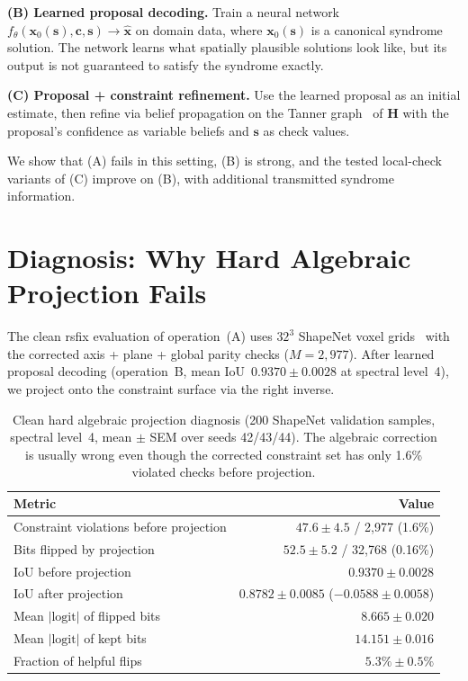 \documentclass[11pt,a4paper]{article}
\begin{document}
\textbf{(B) Learned proposal decoding.}
Train a neural network
$f_\theta(\mathbf{x}_0(\mathbf{s}),\mathbf{c},\mathbf{s}) \to
\hat{\mathbf{x}}$ on domain data, where $\mathbf{x}_0(\mathbf{s})$ is a
canonical syndrome solution. The network learns what spatially plausible
solutions look like, but its output is not guaranteed to satisfy the syndrome
exactly.

\textbf{(C) Proposal + constraint refinement.}
Use the learned proposal as an initial estimate, then refine via belief
propagation on the Tanner graph~\cite{tanner,kfl2001} of $\mathbf{H}$ with the
proposal's confidence as variable beliefs and $\mathbf{s}$ as check values.

We show that (A) fails in this setting, (B) is strong,
and the tested local-check variants of (C) improve on (B), with
additional transmitted syndrome information.

\section{Diagnosis: Why Hard Algebraic Projection Fails}
\label{sec:diagnosis}

The clean rsfix evaluation of operation~(A) uses $32^3$ ShapeNet voxel
grids~\cite{3dr2n2} with the corrected axis + plane + global parity checks
($M = 2{,}977$). After learned proposal decoding (operation~B, mean
IoU~$0.9370\pm0.0028$ at spectral level~4), we project onto the constraint
surface via the right inverse.

\begin{table}[htbp]
\centering
\caption{Clean hard algebraic projection diagnosis (200 ShapeNet validation
  samples, spectral level~4, mean $\pm$ SEM over seeds 42/43/44). The algebraic
  correction is usually wrong even though the corrected constraint set has
  only 1.6\% violated checks before projection.}
\label{tab:projection}
\begin{tabular}{lr}
\toprule
Metric & Value \\
\midrule
Constraint violations before projection & $47.6 \pm 4.5$ / 2{,}977 (1.6\%) \\
Bits flipped by projection & $52.5 \pm 5.2$ / 32{,}768 (0.16\%) \\
IoU before projection & $0.9370 \pm 0.0028$ \\
IoU after projection & $0.8782 \pm 0.0085$ (\textbf{$-0.0588 \pm 0.0058$}) \\
Mean $|\text{logit}|$ of flipped bits & $8.665 \pm 0.020$ \\
Mean $|\text{logit}|$ of kept bits & $14.151 \pm 0.016$ \\
Fraction of helpful flips & $\mathbf{5.3\% \pm 0.5\%}$ \\
\bottomrule
\end{tabular}
\end{table}
\end{document}
